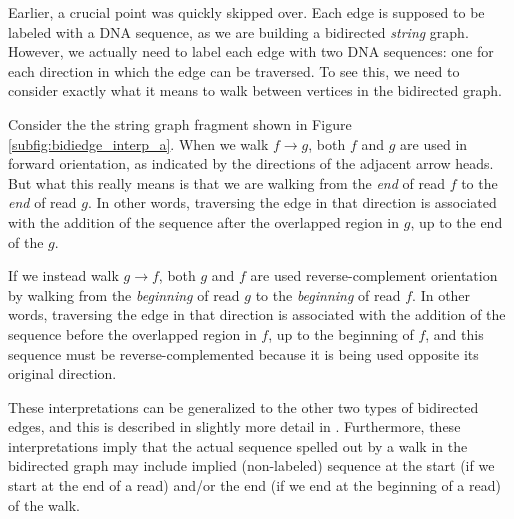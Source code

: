 \documentclass[10pt]{article}
\newcommand{\Subfigure}[1]{Figure \ref{#1}}
\begin{document}
Earlier, a crucial point was quickly skipped over.  Each edge is supposed to be
labeled with a DNA sequence, as we are building a bidirected {\em string} graph.
However, we actually need to label each edge with two DNA sequences: one for
each direction in which the edge can be traversed.  To see this, we need to
consider exactly what it means to walk between vertices in the bidirected graph.

Consider the the string graph fragment shown in
\Subfigure{subfig:bidiedge_interp_a}.  When we walk $f \to g$, both $f$ and $g$
are used in forward orientation, as indicated by the directions of the adjacent
arrow heads.  But what this really means is that we are walking from the {\em
end} of read $f$ to the {\em end} of read $g$.  In other words, traversing the
edge in that direction is associated with the addition of the sequence after the
overlapped region in $g$, up to the end of the $g$.

If we instead walk $g \to f$, both $g$ and $f$ are used reverse-complement
orientation by walking from the {\em beginning} of read $g$ to the {\em
beginning} of read $f$.  In other words, traversing the edge in that direction
is associated with the addition of the sequence before the overlapped region in
$f$, up to the beginning of $f$, and this sequence must be reverse-complemented
because it is being used opposite its original direction.

These interpretations can be generalized to the other two types of bidirected
edges, and this is described in slightly more detail in \cite{Myers2005}.
Furthermore, these interpretations imply that the actual sequence spelled out by
a walk in the bidirected graph may include implied (non-labeled) sequence at the
start (if we start at the end of a read) and/or the end (if we end at the
beginning of a read) of the walk.
\end{document}
